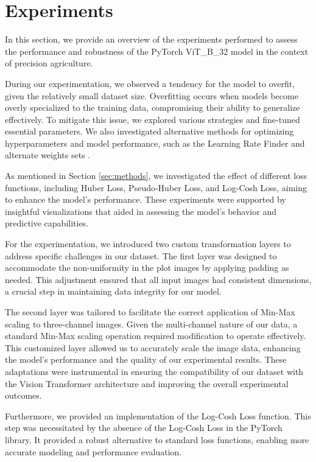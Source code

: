 \section{Experiments}
\label{sec:experiments}

In this section, we provide an overview of the experiments performed to assess the performance and robustness of the PyTorch ViT\_B\_32 model in the context of precision agriculture.

During our experimentation, we observed a tendency for the model to overfit, given the relatively small dataset size. Overfitting occurs when models become overly specialized to the training data, compromising their ability to generalize effectively. To mitigate this issue, we explored various strategies and fine-tuned essential parameters. We also investigated alternative methods for optimizing hyperparameters and model performance, such as the Learning Rate Finder and alternate weights sets \cite{touvron2021training, smith2017cyclical, singh2022revisiting}.

As mentioned in Section \ref{sec:methods}, we investigated the effect of different loss functions, including Huber Loss, Pseudo-Huber Loss, and Log-Cosh Loss, aiming to enhance the model's performance. These experiments were supported by insightful visualizations that aided in assessing the model's behavior and predictive capabilities.

For the experimentation, we introduced two custom transformation layers to address specific challenges in our dataset. The first layer was designed to accommodate the non-uniformity in the plot images by applying padding as needed. This adjustment ensured that all input images had consistent dimensions, a crucial step in maintaining data integrity for our model.

The second layer was tailored to facilitate the correct application of Min-Max scaling to three-channel images. Given the multi-channel nature of our data, a standard Min-Max scaling operation required modification to operate effectively. This customized layer allowed us to accurately scale the image data, enhancing the model's performance and the quality of our experimental results. These adaptations were instrumental in ensuring the compatibility of our dataset with the Vision Transformer architecture and improving the overall experimental outcomes.

Furthermore, we provided an implementation of the Log-Cosh Loss function. This step was necessitated by the absence of the Log-Cosh Loss in the PyTorch library. It provided a robust alternative to standard loss functions, enabling more accurate modeling and performance evaluation.

